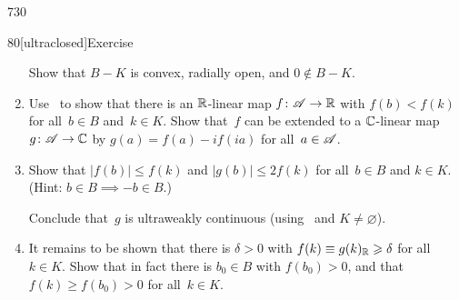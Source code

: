 \begin{parsec}{730}
\begin{point}{80}[ultraclosed]{Exercise}
\begin{enumerate}
	Show that $B-K$ is convex, radially open, and $0\notin B-K$.
\item
	Use~ to show that
	 there is an $\mathbb{R}$-linear map $f\colon \mathscr{A}\to \mathbb{R}$
	with $f(b)<f(k)$ for all~$b\in B$ and~$k\in K$.
	Show that~$f$
	can be extended to a $\mathbb{C}$-linear map
	$g \colon \mathscr{A}\to \mathbb{C}$
	by $g(a)= f(a)-if(ia)$ for all~$a\in\mathscr{A}$.
\item
	Show that $\left| f(b)\right| \leq f(k)$ 
	and $\left|g(b)\right|\leq 2f(k)$
	for all~$b\in B$ and $k\in K$.\\
	(Hint: $b\in B\implies -b\in B$.)

	Conclude that~$g$ is ultraweakly continuous
	(using~ and $K\neq \varnothing$).
\item
	It remains to be shown that
	there is $\delta>0$ with $f(k)\equiv g(k)_{\mathbb{R}}\geqslant \delta$
	for all~$k\in K$.
	Show that in fact there is $b_0\in B$
	with $f(b_0) >0$,
	and  that $f(k)\geq f(b_0)>0 $ for all~$k\in K$.
\end{enumerate}
\spacingfix
\end{point}%
\end{parsec}%
